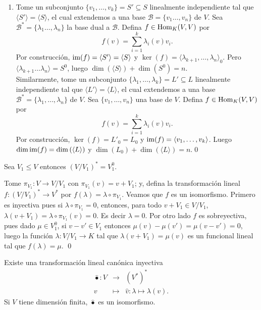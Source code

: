 \begin{enumerate}
\item Tome un subconjunto $\{v_1,\ldots,v_k\}=S'\subseteq S$ linealmente independiente tal que $\langle S'\rangle=\langle S\rangle$, el cual extendemos a una base $\mathcal{B}=\{v_1\ldots,v_n\}$ de $V$. Sea $\mathcal{B}^*=\{\lambda_1\ldots,\lambda_n\}$ la base dual a $\mathcal{B}$. Defina $f\in\operatorname{Hom}_K(V,V)$ por
\[
f(v)=\sum_{i=1}^k\lambda_i(v)v_i.
\]
Por construcci\'on, $\operatorname{im}(f)=\langle S'\rangle=\langle S\rangle$ y $\ker(f)=\langle\lambda_{k+1},\ldots,\lambda_n\rangle_0$. Pero $\langle\lambda_{k+1}\ldots\lambda_{n}\rangle=S^0$, luego $\dim\left(\langle S\rangle\right)+\dim(S^0)=n$.\\
Similarmente, tome un subconjunto $\{\lambda_1,\ldots,\lambda_k\}=L'\subseteq L$ linealmente independiente tal que $\langle L'\rangle=\langle L\rangle$, el cual extendemos a una base $\mathcal{B}^*=\{\lambda_1,\ldots,\lambda_n\}$ de $V$. Sea $\{v_1,\ldots,v_n\}$ una base de $V$. Defina $f\in\operatorname{Hom}_K(V,V)$ por
\[
f(v)=\sum_{i=1}^k\lambda_i(v)v_i.
\]
Por construcci\'on, $\ker(f)=L'_0=L_0$ y $\operatorname{im}(f)=\langle v_1,\ldots,v_k\rangle$. Luego $\dim\operatorname{im}(f)=\dim\left(\langle L\rangle\right)$ y $\dim(L_0)+\dim\left(\langle L\rangle\right)=n$.\qed
\end{enumerate}

\begin{prop}
Sea $V_1\le V$ entonces $\left(V/V_1\right)^*=V_1^0$.
\end{prop}

\dem Tome $\pi_{V_1}:V\rightarrow V/V_1$ con $\pi_{V_1}(v)=v+V_1$; y, defina la transformaci\'on lineal $f:\left(V/V_1\right)^*\rightarrow V^*$ por $f(\lambda)=\lambda\circ\pi_{V_1}$. Veamos que $f$ es un isomorfismo. Primero es inyectiva pues si $\lambda\circ\pi_{V_1}=0$, entonces, para todo $v+V_1\in V/V_1$, $\lambda(v+V_1)=\lambda\circ\pi_{V_1}(v)=0$. Es decir $\lambda=0$. Por otro lado $f$ es sobreyectiva, pues dado $\mu\in V_1^0$, si $v-v'\in V_1$ entonces $\mu(v)-\mu(v')=\mu(v-v')=0$, luego la funci\'on $\lambda:V/V_1\rightarrow K$ tal que $\lambda(v+V_1)=\mu(v)$ es un funcional lineal tal que $f(\lambda)=\mu$. \qed

\begin{teo}\label{dualdual}
Existe una transformaci\'on lineal can\'onica inyectiva
\begin{eqnarray*}
\widehat{\bullet}: V & \longrightarrow & \left(V^*\right)^*\\
                            v &\longmapsto &\widehat{v}:\lambda\mapsto\lambda(v).
\end{eqnarray*}
Si $V$ tiene dimensi\'on finita, $\widehat{\bullet}$ es un isomorfismo.
\end{teo}

